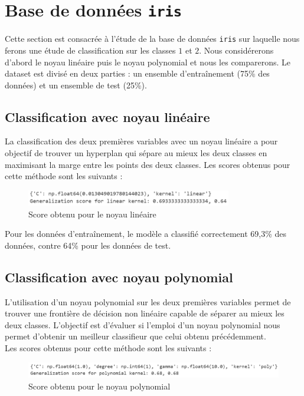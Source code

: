 \documentclass[a4paper,12pt]{article}
\begin{document}
\section{Base de données \texttt{iris}}

Cette section est consacrée à l'étude de la base de données \texttt{iris} sur laquelle nous ferons une étude de classification sur les classes $1$ et $2$.
Nous considérerons d'abord le noyau linéaire puis le noyau polynomial et nous les comparerons.
Le dataset est divisé en deux parties : un ensemble d'entraînement (75\% des données) et un ensemble de test (25\%). 

\subsection{Classification avec noyau linéaire}

La classification des deux premières variables avec un noyau linéaire a pour objectif de trouver un hyperplan qui sépare au mieux les deux classes en maximisant la marge entre les points des deux classes. 
Les scores obtenus pour cette méthode sont les suivants : 

\begin{figure}[H]
    \centering
    \includegraphics[width=0.8\textwidth]{Images/linear_score.png}
    \caption{Score obtenu pour le noyau linéaire}\label{fig : linear}
\end{figure}

Pour les données d'entraînement, le modèle a classifié correctement 69,3\% des données, contre 64\% pour les données de test. 


\subsection{Classification avec noyau polynomial}

L’utilisation d’un noyau polynomial sur les deux premières variables permet de trouver une frontière de décision non linéaire capable de séparer au mieux les deux classes. 
L'objectif est d'évaluer si l'emploi d'un noyau polynomial nous permet d'obtenir un meilleur classifieur que celui obtenu précédemment.\\
Les scores obtenus pour cette méthode sont les suivants :

\begin{figure}[H]
    \centering
    \includegraphics[width=\textwidth]{Images/poly_score.png}
    \caption{Score obtenu pour le noyau polynomial}\label{fig : poly}
\end{figure}
\end{document}
